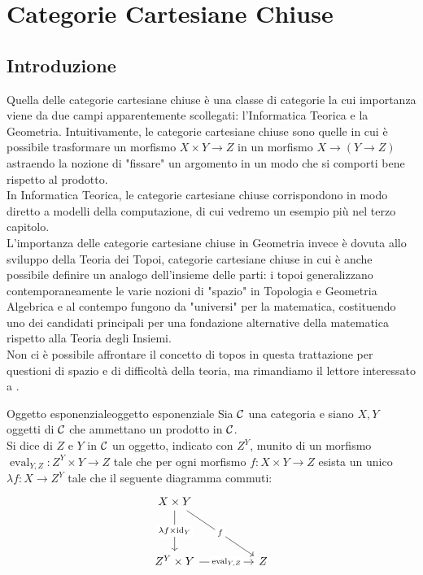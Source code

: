 \documentclass[openany]{book}
\renewcommand\C{\mc{C}}
\begin{document}
\newpage
\newcommand\eval{\operatorname{eval}}
\section{Categorie Cartesiane Chiuse}

\subsection{Introduzione}

Quella delle categorie cartesiane chiuse è una classe di categorie la cui importanza viene da due campi apparentemente scollegati: l'Informatica Teorica e la Geometria. Intuitivamente, le categorie cartesiane chiuse sono quelle in cui è possibile trasformare un morfismo $X\times Y\to Z$ in un morfismo $X\to (Y\to Z)$ astraendo la nozione di "fissare" un argomento in un modo che si comporti bene rispetto al prodotto.\\
In Informatica Teorica, le categorie cartesiane chiuse corrispondono in modo diretto a modelli della computazione, di cui vedremo un esempio più nel terzo capitolo.\\
L'importanza delle categorie cartesiane chiuse in Geometria invece è dovuta allo sviluppo della Teoria dei Topoi, categorie cartesiane chiuse in cui è anche possibile definire un analogo dell'insieme delle parti: i topoi generalizzano contemporaneamente le varie nozioni di "spazio" in Topologia e Geometria Algebrica e al contempo fungono da "universi" per la matematica, costituendo uno dei candidati principali per una fondazione alternative della matematica rispetto alla Teoria degli Insiemi.\\
Non ci è possibile affrontare il concetto di topos in questa trattazione per questioni di spazio e di difficoltà della teoria, ma rimandiamo il lettore interessato a \cite{MacLaneMoerdijk1994}.

\begin{definition}{Oggetto esponenziale}{oggetto esponenziale}
    Sia $\C$ una categoria e siano $X,Y$ oggetti di $\C$ che ammettano un prodotto in $\C$.\\
    Si dice  di $Z$ e $Y$ in $\C$ un oggetto, indicato con $Z^Y$, munito di un morfismo $\eval_{Y,Z} : Z^Y\times Y \to Z$ tale che per ogni morfismo $f:X\times Y \to Z$ esista un unico $\lambda f: X\to Z^Y$ tale che il seguente diagramma commuti:
    \[\begin{tikzcd}
    	{X\times Y} \\
    	\\
    	{Z^Y\times Y} && Z
    	\arrow["{\lambda f\times \id_Y}"{description}, from=1-1, to=3-1]
    	\arrow["f"{description}, from=1-1, to=3-3]
    	\arrow["{\eval_{Y,Z}}"{description}, from=3-1, to=3-3]
    \end{tikzcd}\]
\end{definition}
\end{document}
